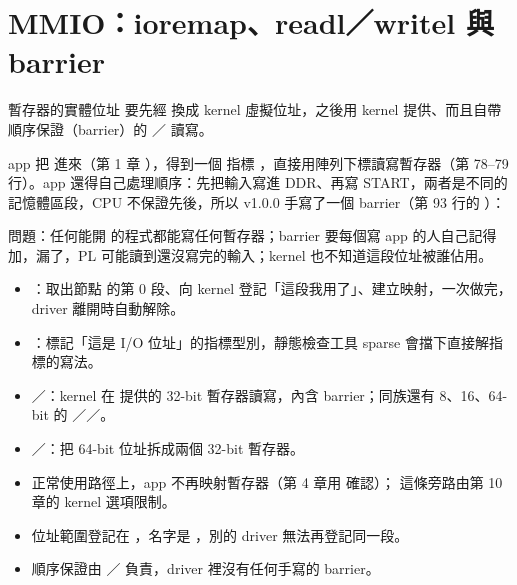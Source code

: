 \section{MMIO：ioremap、readl／writel 與 barrier}
\label{sec:mmio}

\begin{oneline}
暫存器的實體位址  要先經  換成 kernel 虛擬位址，之後用 kernel 提供、而且自帶順序保證（barrier）的 ／ 讀寫。
\end{oneline}

\begin{before}
app 把   進來（第 1 章 ），得到一個  指標 ，直接用陣列下標讀寫暫存器（第 78--79 行）。app 還得自己處理順序：先把輸入寫進 DDR、再寫 START，兩者是不同的記憶體區段，CPU 不保證先後，所以 v1.0.0 手寫了一個 barrier（第 93 行的 ）：


問題：任何能開  的程式都能寫任何暫存器；barrier 要每個寫 app 的人自己記得加，漏了，PL 可能讀到還沒寫完的輸入；kernel 也不知道這段位址被誰佔用。
\end{before}

\begin{tech}
\begin{itemize}
\item {}：取出節點  的第 0 段、向 kernel 登記「這段我用了」、建立映射，一次做完，driver 離開時自動解除。
\item {}：標記「這是 I/O 位址」的指標型別，靜態檢查工具 sparse 會擋下直接解指標的寫法。
\item {}／：kernel 在  提供的 32-bit 暫存器讀寫，內含 barrier；同族還有 8、16、64-bit 的 ／／。
\item {}／：把 64-bit 位址拆成兩個 32-bit 暫存器。
\end{itemize}
\end{tech}

\begin{gain}
\begin{itemize}
\item 正常使用路徑上，app 不再映射暫存器（第 4 章用  確認）； 這條旁路由第 10 章的 kernel 選項限制。
\item 位址範圍登記在 ，名字是 ，別的 driver 無法再登記同一段。
\item 順序保證由 ／ 負責，driver 裡沒有任何手寫的 barrier。
\end{itemize}
\end{gain}

